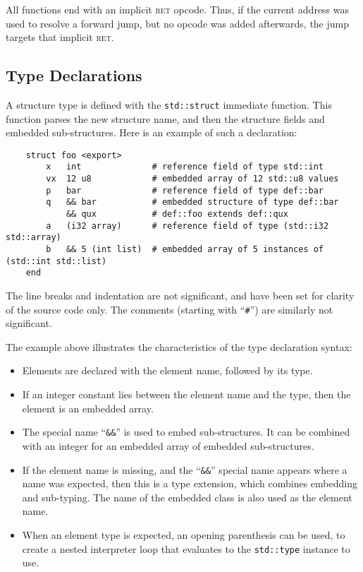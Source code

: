 All functions end with an implicit \textsc{ret} opcode. Thus, if the
current address was used to resolve a forward jump, but no opcode was
added afterwards, the jump targets that implicit \textsc{ret}.

\subsection{Type Declarations}\label{syntax:types}

A structure type is defined with the \verb|std::struct| immediate
function. This function parses the new structure name, and then
the structure fields and embedded sub-structures. Here is an
example of such a declaration:
\begin{verbatim}
    struct foo <export>
        x   int              # reference field of type std::int
        vx  12 u8            # embedded array of 12 std::u8 values
        p   bar              # reference field of type def::bar
        q   && bar           # embedded structure of type def::bar
            && qux           # def::foo extends def::qux
        a   (i32 array)      # reference field of type (std::i32 std::array)
        b   && 5 (int list)  # embedded array of 5 instances of (std::int std::list)
    end
\end{verbatim}
The line breaks and indentation are not significant, and have been set
for clarity of the source code only. The comments (starting with
``\verb|#|'') are similarly not significant.

The example above illustrates the characteristics of the type declaration
syntax:
\begin{itemize}

    \item Elements are declared with the element name, followed by its
    type.

    \item If an integer constant lies between the element name and the
    type, then the element is an embedded array.

    \item The special name ``\verb|&&|'' is used to embed sub-structures.
    It can be combined with an integer for an embedded array of embedded
    sub-structures.

    \item If the element name is missing, and the ``\verb|&&|'' special
    name appears where a name was expected, then this is a type extension,
    which combines embedding and sub-typing. The name of the embedded
    class is also used as the element name.

    \item When an element type is expected, an opening parenthesis can be
    used, to create a nested interpreter loop that evaluates to the
    \verb|std::type| instance to use.

\end{itemize}

